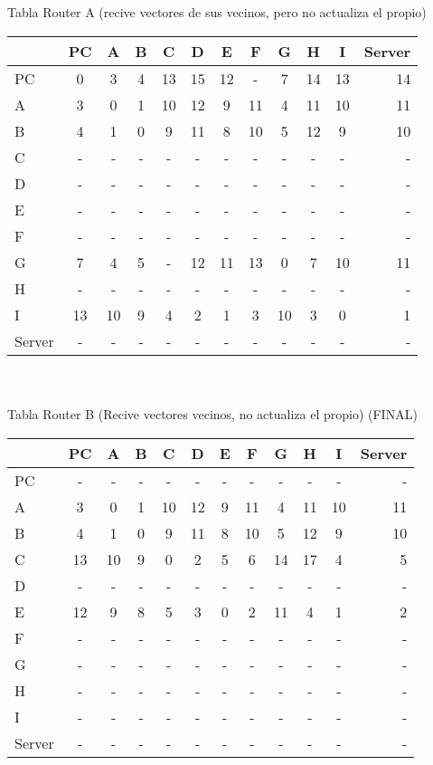 \documentclass{article}
\begin{document}
\\
\\
Tabla Router A (recive vectores de sus vecinos, pero no actualiza el propio) \\
\begin{tabular}{l*{10}{c}r}
              & PC & A & B & C & D & E & F & G & H & I & Server \\
\hline
PC             & 0 & 3 & 4 & 13& 15& 12& - & 7 & 14 & 13 & 14\\
A              & 3 & 0 & 1 & 10 & 12 & 9 & 11 & 4 & 11 & 10 & 11 \\
B              & 4 & 1 & 0 & 9 & 11	& 8 & 10 & 5 & 12 & 9 & 10\\
C              & - & - & - & - & - & - & - & - & - & - & -\\
D              & - & - & - & - & - & - & - & - & - & - & -\\
E              & - & - & - & - & - & - & - & - & - & - & -\\
F              & - & - & - & - & - & - & - & - & - & - & -\\
G              & 7 & 4 & 5 & - & 12 & 11 & 13 & 0 & 7 & 10 & 11\\
H              & - & - & - & - & - & - & - & - & - & - & -\\
I              & 13 & 10 & 9 & 4 & 2 & 1 & 3 & 10 & 3 & 0 & 1\\
Server         & - & - & - & - & - & - & - & - & - & - & -\\

\end{tabular}
\\
\\
Tabla Router B (Recive vectores vecinos, no actualiza el propio) (FINAL) \\
\begin{tabular}{l*{10}{c}r}
              & PC & A & B & C & D & E & F & G & H & I & Server \\
\hline
PC             & - & - & - & - & - & - & - & - & - & - & -\\
A              & 3 & 0 & 1 & 10 & 12 & 9 & 11 & 4 & 11 & 10 & 11 \\
B              & 4 & 1 & 0 & 9 & 11 & 8 & 10 & 5 & 12 & 9 & 10\\
C              & 13 & 10 & 9 & 0 & 2 & 5 & 6 & 14 & 17 & 4 & 5\\
D              & - & - & - & - & - & - & - & - & - & - & -\\
E              & 12 & 9 & 8 & 5 & 3 & 0 & 2 & 11 & 4 & 1 & 2\\
F              & - & - & - & - & - & - & - & - & - & - & -\\
G              & - & - & - & - & - & - & - & - & - & - & -\\
H              & - & - & - & - & - & - & - & - & - & - & -\\
I              & - & - & - & - & - & - & - & - & - & - & -\\
Server         & - & - & - & - & - & - & - & - & - & - & -\\

\end{tabular}
\end{document}
